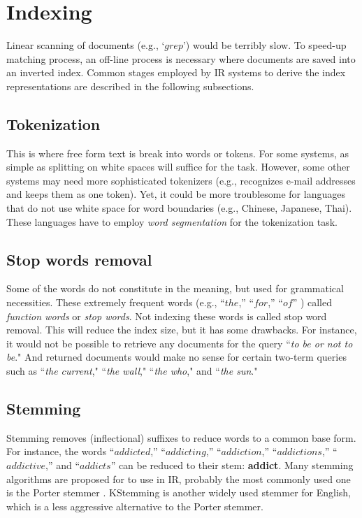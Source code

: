 \section{Indexing}
Linear scanning of documents (e.g., `$grep$') would be terribly slow.
To speed-up matching process, an off-line process is necessary where documents are saved into an inverted index.
Common stages employed by IR systems to derive the index representations are described in the following subsections. 

\subsection{Tokenization}
This is where free form text is break into words or tokens.
For some systems, as simple as splitting on white spaces will suffice for the task.
However, some other systems may need more sophisticated tokenizers (e.g., recognizes e-mail addresses and keeps them as one token).
Yet, it could be more troublesome for languages that do not use white space for word boundaries (e.g., Chinese, Japanese, Thai).
These languages have to employ \emph{word segmentation} for the tokenization task.

\subsection{Stop words removal}
Some of the words do not constitute in the meaning, but used for grammatical necessities.
These extremely frequent words (e.g., ``$the$,'' ``$for$,'' ``$of$'' ) called \emph{function words} or \emph{stop words}.
Not indexing these words is called stop word removal.
This will reduce the index size, but it has some drawbacks.
For instance, it would not be possible to retrieve any documents for the query ``\emph{to be or not to be}."
And returned documents would make no sense for certain two-term queries such as ``\emph{the current}," ``\emph{the wall}," ``\emph{the who}," and ``\emph{the sun}."


\subsection{Stemming}
Stemming removes (inflectional) suffixes to reduce words to a common base form.
For instance, the words {``$addicted$,'' ``$addicting$,'' ``$addiction$,'' ``$addictions$,'' ``$addictive$,'' and ``$addicts$''} can be reduced to their stem: \textbf{addict}. 
Many stemming algorithms are proposed for to use in IR, probably the most commonly used one is the Porter stemmer \citep{porter}.
KStemming \citep{kstem} is another widely used stemmer for English, which is a less aggressive alternative to the Porter stemmer.

